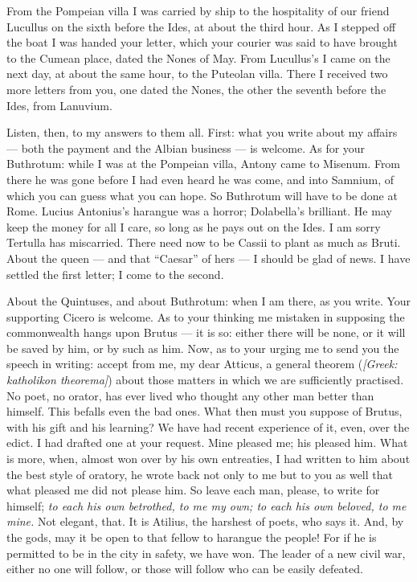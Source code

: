 

 From the Pompeian villa I was carried by ship to the hospitality of our friend Lucullus on the sixth before the Ides, at about the third hour. As I stepped off the boat I was handed your letter, which your courier was said to have brought to the Cumean place, dated the Nones of May. From Lucullus's I came on the next day, at about the same hour, to the Puteolan villa. There I received two more letters from you, one dated the Nones, the other the seventh before the Ides, from Lanuvium.

 Listen, then, to my answers to them all. First: what you write about my affairs --- both the payment and the Albian business --- is welcome. As for your Buthrotum: while I was at the Pompeian villa, Antony came to Misenum. From there he was gone before I had even heard he was come, and into Samnium, of which you can guess what you can hope. So Buthrotum will have to be done at Rome. Lucius Antonius's harangue was a horror; Dolabella's brilliant. He may keep the money for all I care, so long as he pays out on the Ides. I am sorry Tertulla has miscarried. There need now to be Cassii to plant as much as Bruti. About the queen --- and that ``Caesar'' of hers --- I should be glad of news. I have settled the first letter; I come to the second.

 About the Quintuses, and about Buthrotum: when I am there, as you write. Your supporting Cicero is welcome. As to your thinking me mistaken in supposing the commonwealth hangs upon Brutus --- it is so: either there will be none, or it will be saved by him, or by such as him. Now, as to your urging me to send you the speech in writing: accept from me, my dear Atticus, a general theorem (\textit{[Greek: katholikon theorema]}) about those matters in which we are sufficiently practised. No poet, no orator, has ever lived who thought any other man better than himself. This befalls even the bad ones. What then must you suppose of Brutus, with his gift and his learning? We have had recent experience of it, even, over the edict. I had drafted one at your request. Mine pleased me; his pleased him. What is more, when, almost won over by his own entreaties, I had written to him about the best style of oratory, he wrote back not only to me but to you as well that what pleased me did not please him. So leave each man, please, to write for himself; \textit{to each his own betrothed, to me my own; to each his own beloved, to me mine.} Not elegant, that. It is Atilius, the harshest of poets, who says it. And, by the gods, may it be open to that fellow to harangue the people! For if he is permitted to be in the city in safety, we have won. The leader of a new civil war, either no one will follow, or those will follow who can be easily defeated.

